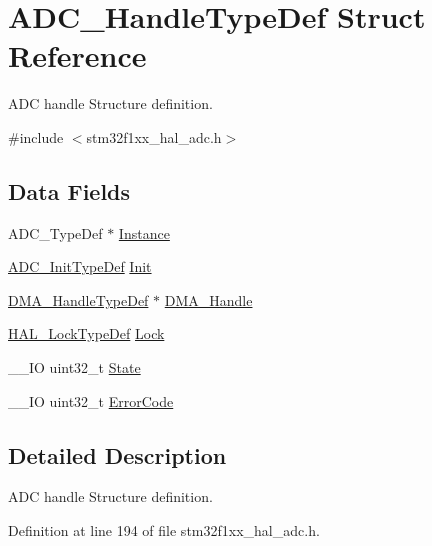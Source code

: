 \hypertarget{struct_a_d_c___handle_type_def}{}\section{A\+D\+C\+\_\+\+Handle\+Type\+Def Struct Reference}
\label{struct_a_d_c___handle_type_def}


A\+DC handle Structure definition.  




{\ttfamily \#include $<$stm32f1xx\+\_\+hal\+\_\+adc.\+h$>$}

\subsection*{Data Fields}
\begin{DoxyCompactItemize}
\item 
A\+D\+C\+\_\+\+Type\+Def $\ast$ \hyperlink{struct_a_d_c___handle_type_def_abfce5509f2d1f9d3ef9012b7b7b528fa}{Instance}
\item 
\hyperlink{struct_a_d_c___init_type_def}{A\+D\+C\+\_\+\+Init\+Type\+Def} \hyperlink{struct_a_d_c___handle_type_def_a95dcd2e98a4cfc17b0939e9ca985113a}{Init}
\item 
\hyperlink{group___d_m_a___exported___types_ga92b907d56a9c29b93d46782a7a04f91e}{D\+M\+A\+\_\+\+Handle\+Type\+Def} $\ast$ \hyperlink{struct_a_d_c___handle_type_def_a26dce701f4dd78176b421b5d6ddee0ba}{D\+M\+A\+\_\+\+Handle}
\item 
\hyperlink{stm32f1xx__hal__def_8h_ab367482e943333a1299294eadaad284b}{H\+A\+L\+\_\+\+Lock\+Type\+Def} \hyperlink{struct_a_d_c___handle_type_def_ad4cf225029dbefe8d3fe660c33b8bb6b}{Lock}
\item 
\+\_\+\+\_\+\+IO uint32\+\_\+t \hyperlink{struct_a_d_c___handle_type_def_ae822ffccdec1899d5cfcbab448119810}{State}
\item 
\+\_\+\+\_\+\+IO uint32\+\_\+t \hyperlink{struct_a_d_c___handle_type_def_a123c5063e6a3b1901b2fbe5f88c53a7e}{Error\+Code}
\end{DoxyCompactItemize}


\subsection{Detailed Description}
A\+DC handle Structure definition. 

Definition at line 194 of file stm32f1xx\+\_\+hal\+\_\+adc.\+h.




